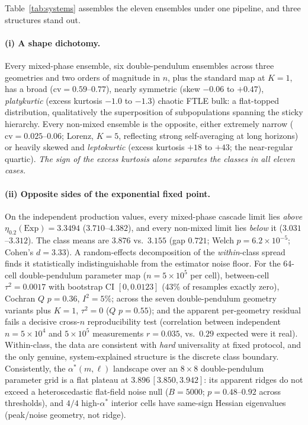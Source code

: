 \documentclass[11pt,a4paper]{article}
\theoremstyle{remark}
\newcommand{\Exp}{\mathrm{Exp}}
\newcommand{\cv}{\mathrm{cv}}
\begin{document}
Table~\ref{tab:systems} assembles the eleven ensembles under one pipeline, and three structures stand
out.

\paragraph{(i) A shape dichotomy.} Every mixed-phase ensemble, six double-pendulum ensembles across
three geometries and two orders of magnitude in $n$, plus the standard map at $K = 1$, has a broad
($\cv = 0.59$--$0.77$), nearly symmetric (skew $-0.06$ to $+0.47$), \emph{platykurtic} (excess
kurtosis $-1.0$ to $-1.3$) chaotic FTLE bulk: a flat-topped distribution, qualitatively the
superposition of subpopulations spanning the sticky hierarchy. Every non-mixed ensemble is the
opposite, either extremely narrow ($\cv = 0.025$--$0.06$; Lorenz, $K{=}5$, reflecting strong
self-averaging at long horizons) or heavily skewed and \emph{leptokurtic} (excess kurtosis $+18$ to
$+43$; the near-regular quartic). \emph{The sign of the excess kurtosis alone separates the classes
in all eleven cases.}

\paragraph{(ii) Opposite sides of the exponential fixed point.} On the independent production values,
every mixed-phase cascade limit lies \emph{above} $\eta_{0.2}(\Exp) = 3.3494$ ($3.710$--$4.382$), and
every non-mixed limit lies \emph{below} it ($3.031$--$3.312$). The class means are $3.876$ vs.\
$3.155$ (gap $0.721$; Welch $p = 6.2\times10^{-5}$; Cohen's $d = 3.33$). A random-effects
decomposition of the \emph{within}-class spread finds it statistically indistinguishable from the
estimator noise floor. For the 64-cell double-pendulum parameter map ($n = 5\times10^{5}$ per cell),
between-cell $\tau^2 = 0.0017$ with bootstrap CI $[0, 0.0123]$ (43\% of resamples exactly zero),
Cochran $Q$ $p = 0.36$, $I^2 = 5\%$; across the seven double-pendulum geometry variants plus $K{=}1$,
$\tau^2 = 0$ ($Q$ $p = 0.55$); and the apparent per-geometry residual fails a decisive cross-$n$
reproducibility test (correlation between independent $n = 5\times10^{4}$ and $5\times10^{5}$
measurements $r = 0.035$, vs.\ $0.29$ expected were it real). Within-class, the data are consistent
with \emph{hard} universality at fixed protocol, and the only genuine, system-explained structure is
the discrete class boundary. Consistently, the $\alpha^*(m,\ell)$ landscape over an $8\times8$
double-pendulum parameter grid is a flat plateau at $3.896\,[3.850, 3.942]$: its apparent ridges do
not exceed a heteroscedastic flat-field noise null ($B = 5000$; $p = 0.48$--$0.92$ across
thresholds), and $4/4$ high-$\alpha^*$ interior cells have same-sign Hessian eigenvalues (peak/noise
geometry, not ridge).
\end{document}

